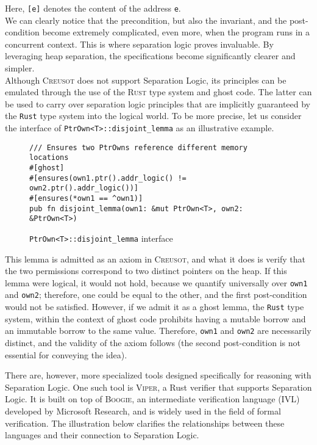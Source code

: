 \documentclass[11pt,a4paper]{article}
\begin{document}
Here, \texttt{[e]} denotes the content of the address \texttt{e}.\\
We can clearly notice that the precondition, but also the invariant, and the post-condition become extremely complicated, even more, when the program runs in a concurrent context. This is where separation logic proves invaluable. By leveraging heap separation, the specifications become significantly clearer and simpler.\\

Although \textsc{Creusot} does not support Separation Logic, its principles can be emulated through the use of the \textsc{Rust} type system and ghost code.
The latter can be used to carry over separation logic principles that are implicitly guaranteed by the \texttt{Rust} type system into the logical world. To be more precise, let us consider the interface of \texttt{PtrOwn<T>::disjoint\_lemma} as an illustrative example.

\begin{figure}[h]
\centering
\begin{minipage}{0.9\linewidth}
\begin{verbatim}
/// Ensures two PtrOwns reference different memory locations
#[ghost]
#[ensures(own1.ptr().addr_logic() != own2.ptr().addr_logic())]
#[ensures(*own1 == ^own1)]
pub fn disjoint_lemma(own1: &mut PtrOwn<T>, own2: &PtrOwn<T>)
\end{verbatim}
\caption{\texttt{PtrOwn<T>::disjoint\_lemma} interface}
\end{minipage}
\end{figure}

This lemma is admitted as an axiom in \textsc{Creusot}, and what it does is verify that the two permissions correspond to two distinct pointers on the heap.
If this lemma were logical, it would not hold, because we quantify universally over \texttt{own1} and \texttt{own2}; therefore, one could be equal to the other, and the first post-condition would not be satisfied.
However, if we admit it as a ghost lemma, the \texttt{Rust} type system, within the context of ghost code prohibits having a mutable borrow and an immutable borrow to the same value.
Therefore, \texttt{own1} and \texttt{own2} are necessarily distinct, and the validity of the axiom follows (the second post-condition is not essential for conveying the idea).

There are, however, more specialized tools designed specifically for reasoning with Separation Logic. One such tool is \textsc{Viper}, a Rust verifier that supports Separation Logic. It is built on top of \textsc{Boogie}, an intermediate verification language (IVL) developed by Microsoft Research, and is widely used in the field of formal verification. The illustration below clarifies the relationships between these languages and their connection to Separation Logic.
\end{document}
